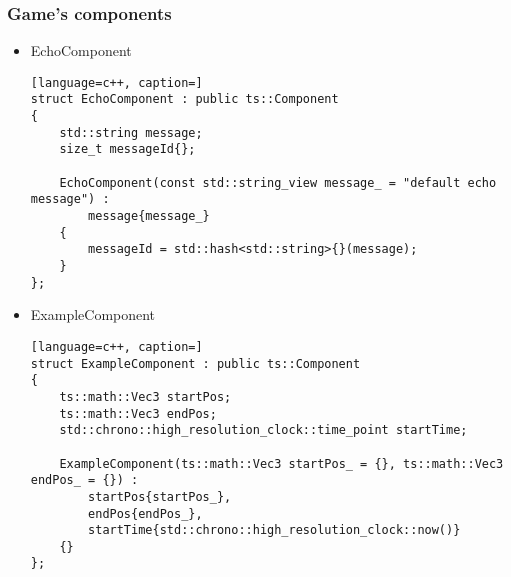 \subsubsection{Game's components}
\begin{itemize}
    \item EchoComponent
\begin{lstlisting}[language=c++, caption=]
struct EchoComponent : public ts::Component
{
    std::string message;
    size_t messageId{};

    EchoComponent(const std::string_view message_ = "default echo message") :
        message{message_}
    {
        messageId = std::hash<std::string>{}(message);
    }
};
\end{lstlisting}
    \item ExampleComponent
\begin{lstlisting}[language=c++, caption=]
struct ExampleComponent : public ts::Component
{
    ts::math::Vec3 startPos;
    ts::math::Vec3 endPos;
    std::chrono::high_resolution_clock::time_point startTime;

    ExampleComponent(ts::math::Vec3 startPos_ = {}, ts::math::Vec3 endPos_ = {}) :
        startPos{startPos_},
        endPos{endPos_},
        startTime{std::chrono::high_resolution_clock::now()}
    {}
};
\end{lstlisting}
\end{itemize}

